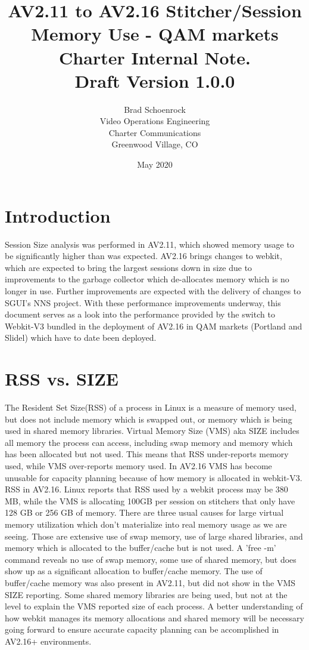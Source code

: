 \documentclass{article}
\author{Brad Schoenrock\\Video Operations Engineering\\Charter Communications\\Greenwood Village, CO}
\title{AV2.11 to AV2.16 Stitcher/Session Memory Use - QAM markets\\Charter Internal Note.\\Draft Version 1.0.0}
\date{May 2020}
\begin{document}
\maketitle
\newpage

\tableofcontents
\newpage

\section{Introduction}
\label{SECTION-Introduction}

Session Size analysis was performed in AV2.11, which showed memory usage to be significantly higher than was expected. AV2.16 brings changes to webkit, which are expected to bring the largest sessions down in size due to improvements to the garbage collector which de-allocates memory which is no longer in use. Further improvements are expected with the delivery of changes to SGUI's NNS project. With these performance improvements underway, this document serves as a look into the performance provided by the switch to Webkit-V3 bundled in the deployment of AV2.16 in QAM markets (Portland and Slidel) which have to date been deployed. 

\section{RSS vs. SIZE}
\label{SECTION-RSS}

The Resident Set Size(RSS) of a process in Linux is a measure of memory used, but does not include memory which is swapped out, or memory which is being used in shared memory libraries. Virtual Memory Size (VMS) aka SIZE includes all memory the process can access, including swap memory and memory which has been allocated but not used. This means that RSS under-reports memory used, while VMS over-reports memory used. In AV2.16 VMS has become unusable for capacity planning because of how memory is allocated in webkit-V3. RSS in AV2.16. Linux reports that RSS used by a webkit process may be 380 MB, while the VMS is allocating 100GB per session on stitchers that only have 128 GB or 256 GB of memory. There are three usual causes for large virtual memory utilization which don't materialize into real memory usage as we are seeing. Those are extensive use of swap memory, use of large shared libraries, and memory which is allocated to the buffer/cache but is not used. A 'free -m' command reveals no use of swap memory, some use of shared memory, but does show up as a significant allocation to buffer/cache memory. The use of buffer/cache memory was also present in AV2.11, but did not show in the VMS SIZE reporting. Some shared memory libraries are being used, but not at the level to explain the VMS reported size of each process. A better understanding of how webkit manages its memory allocations and shared memory will be necessary going forward to ensure accurate capacity planning can be accomplished in AV2.16+ environments. 
\end{document}
